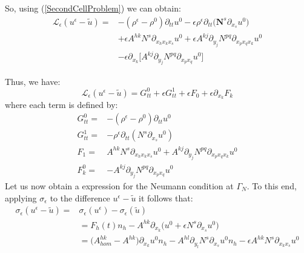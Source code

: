 So, using (\ref{SecondCellProblem}) we can obtain:
\begin{align*}
    \mathcal{L}_{\epsilon} (u^{\epsilon} -\tilde{u})  = & - (\rho^{\epsilon}-\rho^0) \partial_{tt} u^0 - \epsilon \rho^{\epsilon} \partial_{tt}\big(\mathbf{N}^s \partial_{x_s}u^0 \big)  \\
    & + \epsilon A^{hk} N^s \partial_{x_h x_k x_s} u^0 + \epsilon A^{kj} \partial_{y_j} N^{pq} \partial_{x_p x_q x_k} u^0  \\
    & - \epsilon \partial_{x_k} \big[ A^{kj} \partial_{y_j} N^{pq} \partial_{x_p x_q} u^0\big] 
\end{align*}

Thus, we have:
\begin{equation}
    \mathcal{L}_{\epsilon} (u^{\epsilon}-\tilde{u}) = G_{tt}^0 + \epsilon G_{tt}^1 + \epsilon F_0 + \epsilon \partial_{x_k} F_k
\end{equation}
where each term is defined by:
\begin{equation}
    \label{Variables}
    \begin{aligned}
        G_{tt}^0 = & -(\rho^{\epsilon} - \rho^0) \partial_{tt}u^0 \\
        G_{tt}^1 = & -\rho^{\epsilon} \partial_{tt}(N^s \partial_{x_s} u^0) \\
        F_1 = & A^{hk}N^s \partial_{x_h x_k x_s} u^0  + A^{kj}\partial_{y_j} N^{pq} \partial_{x_p x_q x_k} u^0 \\
        F^0_k = & - A^{kj} \partial_{y_j} N^{pq} \partial_{x_p x_q} u^0 
    \end{aligned}
\end{equation}
Let us now obtain a expression for the Neumann condition at $\Gamma_N$. To this end, applying $\sigma_{\epsilon}$ to the difference $u^{\epsilon} - \tilde{u}$ it follows that:
\begin{align*}
    \sigma_{\epsilon} (u^{\epsilon} - \tilde{u}) = & \sigma_{\epsilon}(u^{\epsilon}) - \sigma_{\epsilon} (\tilde{u}) \\
    & = F_h(t) n_h - A^{hk} \partial_{x_k} \big( u^0 + \epsilon N^s \partial_{x_s}u^0 \big) \\
    & = \big(A^{hk}_{hom} - A^{hk} \big) \partial_{x_k} u^0 n_h - A^{hl} \partial_{y_l} N^s \partial_{x_s} u^0 n_h - \epsilon A^{hk} N^s \partial_{x_k x_s} u^0 
\end{align*}


